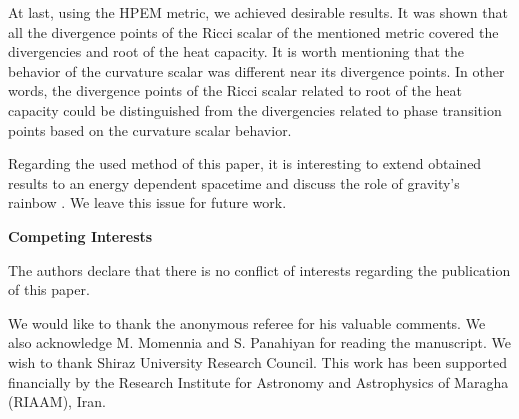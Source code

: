\documentclass[aps,onecolumn ]{revtex4}
\begin{document}
At last, using the HPEM metric, we achieved desirable results. It
was shown that all the divergence points of the Ricci scalar of
the mentioned metric covered the divergencies and root of the heat
capacity. It is worth mentioning that the behavior of the
curvature scalar was different near its divergence points. In
other words, the divergence points of the Ricci scalar related to
root of the heat capacity could be distinguished from the
divergencies related to phase transition points based on the
curvature scalar behavior.

Regarding the used method of this paper, it is interesting to
extend obtained results to an energy dependent spacetime and
discuss the role of gravity's rainbow
\cite{raibow1,rainbow2,rainbow3,rainbow4}. We leave this issue for
future work.


\begin{center}
\textbf{Competing Interests}
\end{center}
The authors declare that there is no conflict of interests
regarding the publication of this paper.


\begin{acknowledgements}
We would like to thank the anonymous referee for his valuable
comments. We also acknowledge M. Momennia and S. Panahiyan for
reading the manuscript. We wish to thank Shiraz University
Research Council. This work has been supported financially by the
Research Institute for Astronomy and Astrophysics of Maragha
(RIAAM), Iran.
\end{acknowledgements}
\end{document}
